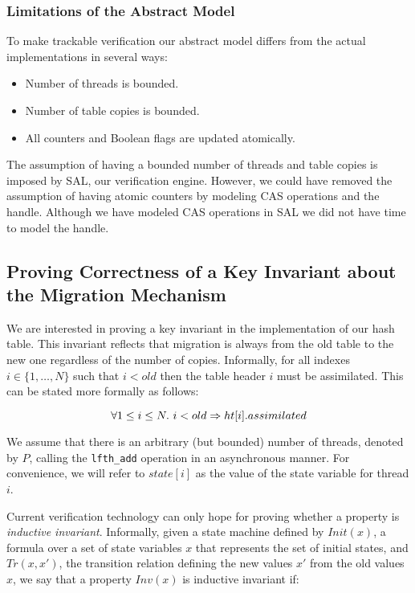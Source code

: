 \subsubsection{Limitations of the Abstract Model}

To make trackable verification our abstract model differs from the
actual implementations in several ways:

\begin{itemize}
\item Number of threads is bounded.
\item Number of table copies is bounded.
\item All counters and Boolean flags are updated atomically.  
\end{itemize}

The assumption of having a bounded number of threads and table copies
is imposed by SAL, our verification engine. However, we could have
removed the assumption of having atomic counters by modeling CAS
operations and the handle. Although we have modeled CAS operations in
SAL we did not have time to model the handle.


\subsection{Proving Correctness of a Key Invariant about the Migration Mechanism}

We are interested in proving a key invariant in the implementation of
our hash table. This invariant reflects that migration is always from
the old table to the new one regardless of the number of
copies. Informally, for all indexes $i \in \{1, \ldots, N\}$ such that
$i < old$ then the table header $i$ must be assimilated. This can be stated
more formally as follows:

  \[ \forall 1 \leq i \leq N.~ i < old \Rightarrow \mbox{$ht[i]$}.assimilated \]

We assume that there is an arbitrary (but bounded) number of threads,
denoted by $P$, calling the \texttt{lfth\_add} operation in an
asynchronous manner. For convenience, we will refer to $state[i]$ as
the value of the state variable for thread $i$.


Current verification technology can only hope for proving whether a
property is \emph{inductive invariant}. Informally, given a state
machine defined by $Init(x)$, a formula over a set of state variables
$x$ that represents the set of initial states, and $Tr(x,x')$, the
transition relation defining the new values $x'$ from the old values
$x$, we say that a property $Inv(x)$ is inductive invariant if:

